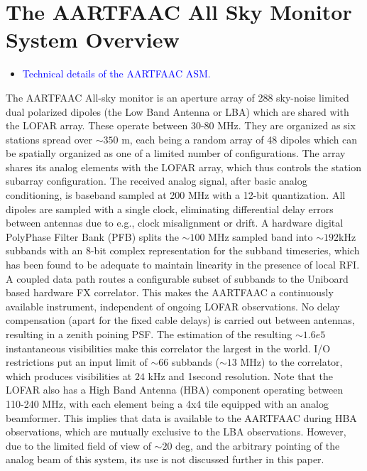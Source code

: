\documentclass{aa}
\begin{document}
\section{\label{sec:The-AARTFAAC-All}The AARTFAAC All Sky Monitor System
Overview}
\begin{itemize}
\item \textcolor{blue}{Technical details of the AARTFAAC ASM.}
\end{itemize}
The AARTFAAC All-sky monitor is an aperture array of 288 sky-noise
limited dual polarized dipoles (the Low Band Antenna or LBA) which
are shared with the LOFAR array. These operate between 30-80 MHz.
They are organized as six stations spread over $\sim$$350$ m, each
being a random array of 48 dipoles which can be spatially organized
as one of a limited number of configurations. The array shares its
analog elements with the LOFAR array, which thus controls the station
subarray configuration. The received analog signal, after basic analog
conditioning, is baseband sampled at 200 MHz with a 12-bit quantization.
All dipoles are sampled with a single clock, eliminating differential
delay errors between antennas due to e.g., clock misalignment or drift.
A hardware digital PolyPhase Filter Bank (PFB) splits the $\sim$$100$
MHz sampled band into $\sim$$192$kHz subbands with an 8-bit complex
representation for the subband timeseries, which has been found to
be adequate to maintain linearity in the presence of local RFI. A
coupled data path routes a configurable subset of subbands to the
Uniboard based hardware FX correlator. This makes the AARTFAAC a continuously
available instrument, independent of ongoing LOFAR observations. No
delay compensation (apart for the fixed cable delays) is carried out
between antennas, resulting in a zenith poining PSF. The estimation
of the resulting $\sim$$1.6e5$ instantaneous visibilities make this
correlator the largest in the world. I/O restrictions put an input
limit of $\sim$$66$ subbands ($\sim$$13$ MHz) to the correlator,
which produces visibilities at $24$ kHz and 1second resolution. Note
that the LOFAR also has a High Band Antenna (HBA) component operating
between 110-240 MHz, with each element being a 4x4 tile equipped with
an analog beamformer. This implies that data is available to the AARTFAAC
during HBA observations, which are mutually exclusive to the LBA observations.
However, due to the limited field of view of $\sim$$20$ deg, and
the arbitrary pointing of the analog beam of this system, its use
is not discussed further in this paper. 
\end{document}
